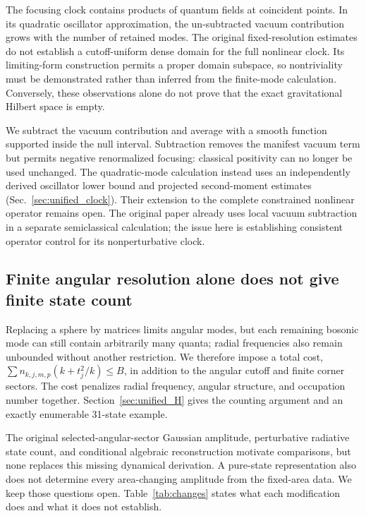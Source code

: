 \documentclass[onecolumn,11pt,aps,prd,amsmath,amssymb,nofootinbib,floatfix]{revtex4-2}
\begin{document}
The focusing clock contains products of quantum fields at coincident points. In its quadratic oscillator approximation, the un-subtracted vacuum contribution grows with the number of retained modes. The original fixed-resolution estimates do not establish a cutoff-uniform dense domain for the full nonlinear clock. Its limiting-form construction permits a proper domain subspace, so nontriviality must be demonstrated rather than inferred from the finite-mode calculation. Conversely, these observations alone do not prove that the exact gravitational Hilbert space is empty.

We subtract the vacuum contribution and average with a smooth function supported inside the null interval. Subtraction removes the manifest vacuum term but permits negative renormalized focusing: classical positivity can no longer be used unchanged. The quadratic-mode calculation instead uses an independently derived oscillator lower bound and projected second-moment estimates (Sec.~\ref{sec:unified_clock}). Their extension to the complete constrained nonlinear operator remains open. The original paper already uses local vacuum subtraction in a separate semiclassical calculation; the issue here is establishing consistent operator control for its nonperturbative clock.

\subsection{Finite angular resolution alone does not give finite state count}

Replacing a sphere by matrices limits angular modes, but each remaining bosonic mode can still contain arbitrarily many quanta; radial frequencies also remain unbounded without another restriction. We therefore impose a total cost, $\sum n_{k,j,m,p}(k+t_j^2/k)\le B$, in addition to the angular cutoff and finite corner sectors. The cost penalizes radial frequency, angular structure, and occupation number together. Section~\ref{sec:unified_H} gives the counting argument and an exactly enumerable 31-state example.

The original selected-angular-sector Gaussian amplitude, perturbative radiative state count, and conditional algebraic reconstruction motivate comparisons, but none replaces this missing dynamical derivation. A pure-state representation also does not determine every area-changing amplitude from the fixed-area data. We keep those questions open. Table~\ref{tab:changes} states what each modification does and what it does not establish.
\end{document}
